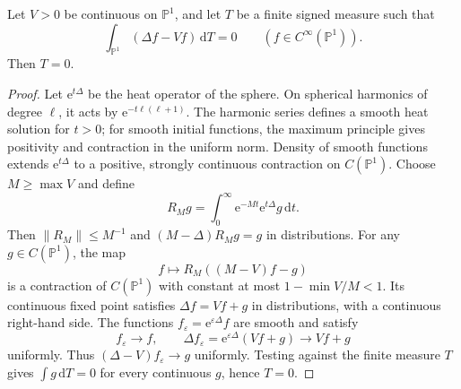 \begin{lemma}\label{lem:sphere-signed-resolvent}
Let $V>0$ be continuous on $\mathbb P^1$, and let $T$ be a finite signed measure such that
\[
 \int_{\mathbb P^1}(\Delta f-Vf)\,\mathrm{d}T=0
 \qquad(f\in C^\infty(\mathbb P^1)).
\]
Then $T=0$.
\end{lemma}
\begin{proof}
Let $\mathrm{e}^{t\Delta}$ be the heat operator of the sphere. On spherical harmonics of degree $\ell$, it acts by $\mathrm{e}^{-t\ell(\ell+1)}$. The harmonic series defines a smooth heat solution for $t>0$; for smooth initial functions, the maximum principle gives positivity and contraction in the uniform norm. Density of smooth functions extends $\mathrm{e}^{t\Delta}$ to a positive, strongly continuous contraction on $C(\mathbb P^1)$. Choose $M\geq\max V$ and define
\[
 R_Mg=\int_0^\infty\mathrm{e}^{-Mt}\mathrm{e}^{t\Delta}g\,\mathrm{d}t.
\]
Then $\|R_M\|\leq M^{-1}$ and $(M-\Delta)R_Mg=g$ in distributions. For any $g\in C(\mathbb P^1)$, the map
\[
 f\longmapsto R_M((M-V)f-g)
\]
is a contraction of $C(\mathbb P^1)$ with constant at most $1-\min V/M<1$. Its continuous fixed point satisfies $\Delta f=Vf+g$ in distributions, with a continuous right-hand side. The functions $f_\varepsilon=\mathrm{e}^{\varepsilon\Delta}f$ are smooth and satisfy
\[
 f_\varepsilon\longrightarrow f,\qquad
 \Delta f_\varepsilon=\mathrm{e}^{\varepsilon\Delta}(Vf+g)\longrightarrow Vf+g
\]
uniformly. Thus $(\Delta-V)f_\varepsilon\to g$ uniformly. Testing against the finite measure $T$ gives $\int g\,\mathrm{d}T=0$ for every continuous $g$, hence $T=0$.
\end{proof}

